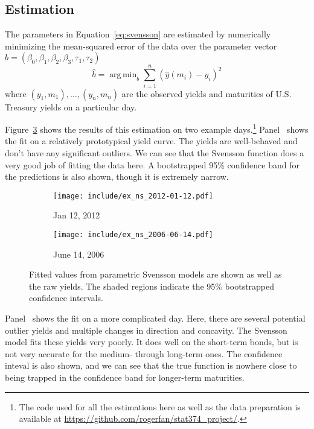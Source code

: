 \documentclass[12pt]{article}
\DeclareMathOperator*{\argmin}{arg\,min}
\begin{document}
\subsection{Estimation}

The parameters in Equation~\ref{eq:svensson} are estimated by numerically minimizing the mean-squared error of the data over the parameter vector $b = (\beta_0, \beta_1, \beta_2, \beta_3, \tau_1, \tau_2)$
\begin{equation*}
\hat{b} = \argmin_{b} \sum_{i=1}^n \left( \hat{y}(m_i) - y_i \right)^2
\end{equation*}
where $(y_1, m_1), \dots, (y_n, m_n)$ are the observed yields and maturities of U.S. Treasury yields on a particular day.

Figure~\ref{fig:ex_ns} shows the results of this estimation on two example days.\footnote{The code used for all the estimations here as well as the data preparation is available at \url{https://github.com/rogerfan/stat374_project/}.} Panel~ shows the fit on a relatively prototypical yield curve. The yields are well-behaved and don't have any significant outliers. We can see that the Svensson function does a very good job of fitting the data here. A bootstrapped 95\% confidence band for the predictions is also shown, though it is extremely narrow.

\begin{figure}[htb] \centering
    \begin{subfigure}[t]{.49\linewidth}
        \texttt{[image: include/ex\_ns\_2012-01-12.pdf]}
        \caption{Jan 12, 2012} \label{fig:ex_ns_1-12-2012}
    \end{subfigure}
    \begin{subfigure}[t]{.49\linewidth}
        \texttt{[image: include/ex\_ns\_2006-06-14.pdf]}
        \caption{June 14, 2006} \label{fig:ex_ns_6-14-2006}
    \end{subfigure}
    \caption{Fitted values from parametric Svensson models are shown as well as the raw yields. The shaded regions indicate the 95\% bootstrapped confidence intervals.}
    \label{fig:ex_ns}
\end{figure}

Panel~ shows the fit on a more complicated day. Here, there are several potential outlier yields and multiple changes in direction and concavity. The Svensson model fits these yields very poorly. It does well on the short-term bonds, but is not very accurate for the medium- through long-term ones. The confidence inteval is also shown, and we can see that the true function is nowhere close to being trapped in the confidence band for longer-term maturities.
\end{document}
